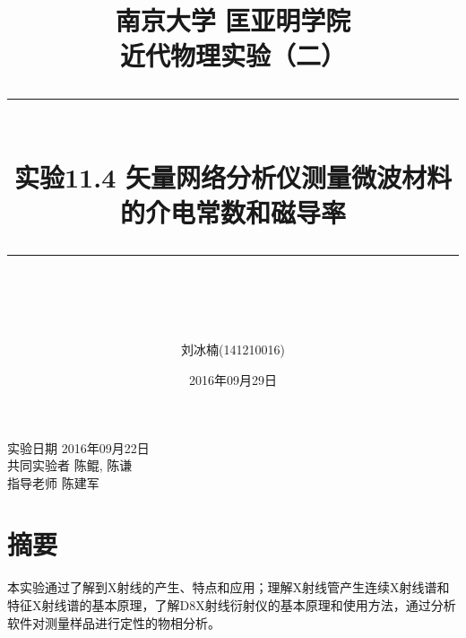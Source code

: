 \documentclass{article} %
\title{
    \normalfont \normalsize 
    \textsc
    {\kaishu 南京大学 \quad 匡亚明学院 \\ 
        近代物理实验（二）} \\
    [10pt] 
    \rule{\linewidth}{0.5pt} \\[6pt] 
    \huge 实验11.4 \quad 矢量网络分析仪测量微波材料的介电常数和磁导率 \\
    \rule{\linewidth}{2pt}  \\[10pt]
}
\author{刘冰楠(141210016)}
\date{\normalsize 2016年09月29日}
\begin{document}

\maketitle
\noindent
实验日期 \dotfill 2016年09月22日 \\
共同实验者 \dotfill 陈鲲, 陈谦 \\
指导老师 \dotfill 陈建军 \\



%
%
%
%





\section{摘要}
本实验通过了解到X射线的产生、特点和应用；理解X射线管产生连续X射线谱和特征X射线谱的基本原理，了解D8X射线衍射仪的基本原理和使用方法，通过分析软件对测量样品进行定性的物相分析。
\end{document}
